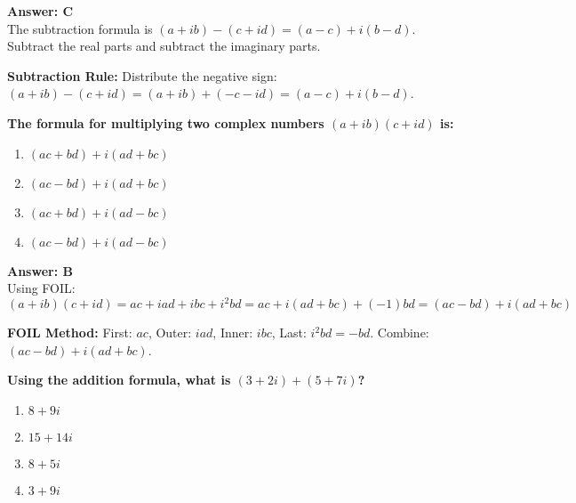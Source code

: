 \documentclass[12pt,a4paper]{article}
\begin{document}
\begin{answerstyle}
\textbf{Answer: C} \\
The subtraction formula is \( (a + ib) - (c + id) = (a - c) + i(b - d) \). Subtract the real parts and subtract the imaginary parts.
\end{answerstyle}

\begin{conceptbox}
\textbf{Subtraction Rule:} Distribute the negative sign: \( (a + ib) - (c + id) = (a + ib) + (-c - id) = (a - c) + i(b - d) \).
\end{conceptbox}

\newpage
\begin{questiontitle}[MCQ 44]
\textbf{The formula for multiplying two complex numbers \( (a + ib)(c + id) \) is:}
\end{questiontitle}

\begin{partbox}[Options]
\begin{enumerate}[label=\Alph*.]
    \item \( (ac + bd) + i(ad + bc) \)
    \item \( (ac - bd) + i(ad + bc) \)
    \item \( (ac + bd) + i(ad - bc) \)
    \item \( (ac - bd) + i(ad - bc) \)
\end{enumerate}
\end{partbox}

\begin{answerstyle}
\textbf{Answer: B} \\
Using FOIL: \( (a + ib)(c + id) = ac + iad + ibc + i^2bd = ac + i(ad + bc) + (-1)bd = (ac - bd) + i(ad + bc) \)
\end{answerstyle}

\begin{conceptbox}
\textbf{FOIL Method:} First: \( ac \), Outer: \( iad \), Inner: \( ibc \), Last: \( i^2bd = -bd \). Combine: \( (ac - bd) + i(ad + bc) \).
\end{conceptbox}

\newpage
\begin{questiontitle}[MCQ 45]
\textbf{Using the addition formula, what is \( (3 + 2i) + (5 + 7i) \)?}
\end{questiontitle}

\begin{partbox}[Options]
\begin{enumerate}[label=\Alph*.]
    \item \( 8 + 9i \)
    \item \( 15 + 14i \)
    \item \( 8 + 5i \)
    \item \( 3 + 9i \)
\end{enumerate}
\end{partbox}
\end{document}
